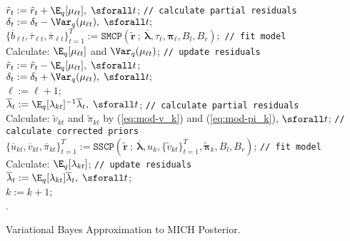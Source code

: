 \begin{algorithm}[!h]
{{    }
     {
      $\tilde{r}_t := \tilde{r}_t + \E_q[\mu_{\ell t}],\; \sforall t$; \texttt{// calculate partial residuals} \\
      $\delta_t := \delta_t -  \Var_q(\mu_{\ell t}),\; \sforall t;$ \\
      $\{\overline{b}_{\ell t}, \overline{\tau}_{\ell t}, \overline{\pi}_{\ell t}\}_{t=1}^T := \texttt{SMCP}(\tilde{\mathbf{r}} \:;\: \overline{\pmb{\lambda}}, \tau_{\ell}, \pmb{\pi}_{\ell}, B_l,B_r);$ \texttt{// fit model} \\
      Calculate: $\E_q[\mu_{\ell t}]$ and $\Var_q(\mu_{\ell t})$; \texttt{// update residuals} \\
      $\tilde{r}_t := \tilde{r}_t - \E_q[\mu_{\ell t}],\; \sforall t$; \\
      $\delta_t := \delta_t + \Var_q(\mu_{\ell t}),\; \sforall t;$ \\
      $\ell := \ell + 1$; \\
    }
     {
      $\overline{\lambda}_t := \E_q[\lambda_{k t}]^{-1}\overline{\lambda}_t, \; \sforall t$; \texttt{// calculate partial residuals}\\
      Calculate: $\tilde{v}_{kt}$ and $\tilde{\pi}_{kt}$ by (\ref{eq:mod-v_k}) and (\ref{eq:mod-pi_k}), $\sforall t$; \texttt{// calculate corrected priors} \\
      $\{\overline{u}_{kt}, \overline{v}_{kt}, \overline{\pi}_{kt}\}_{t=1}^T := \texttt{SSCP}(\tilde{\mathbf{r}} 
      \:;\:\overline{\pmb{\lambda}}, u_k, \{\tilde{v}_{kt}\}_{t=1}^T, \tilde{\pmb{\pi}}_k, B_l,B_r)$; \texttt{// fit model} \\
      Calculate: $\E_q[\lambda_{k t}]$; \texttt{// update residuals} \\
      $\overline{\lambda}_t := \E_q[\lambda_{kt}]\overline{\lambda}_t, \; \sforall t$; \\
      $k := k + 1$; \\
    }
  }
  .
  \caption{Variational Bayes Approximation to MICH Posterior.}
\end{algorithm}